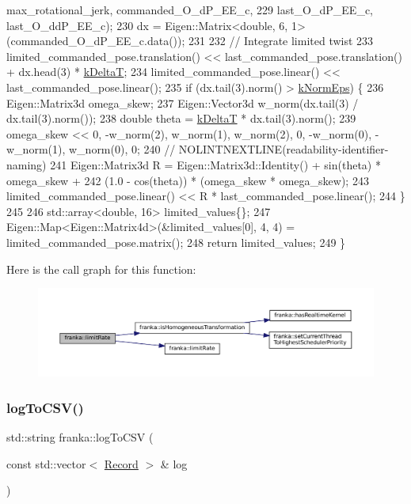 \begin{DoxyCode}
      max\_rotational\_jerk, commanded\_O\_dP\_EE\_c,
229                 last\_O\_dP\_EE\_c, last\_O\_ddP\_EE\_c);
230   dx = Eigen::Matrix<double, 6, 1>(commanded\_O\_dP\_EE\_c.data());
231 
232   \textcolor{comment}{// Integrate limited twist}
233   limited\_commanded\_pose.translation() << last\_commanded\_pose.translation() + dx.head(3) * 
      \hyperlink{namespacefranka_a1e207a0d5a6e90c1e1a78e6e1057120a}{kDeltaT};
234   limited\_commanded\_pose.linear() << last\_commanded\_pose.linear();
235   \textcolor{keywordflow}{if} (dx.tail(3).norm() > \hyperlink{namespacefranka_a420d72830a872ef375d9d6cbb1c439b5}{kNormEps}) \{
236     Eigen::Matrix3d omega\_skew;
237     Eigen::Vector3d w\_norm(dx.tail(3) / dx.tail(3).norm());
238     \textcolor{keywordtype}{double} theta = \hyperlink{namespacefranka_a1e207a0d5a6e90c1e1a78e6e1057120a}{kDeltaT} * dx.tail(3).norm();
239     omega\_skew << 0, -w\_norm(2), w\_norm(1), w\_norm(2), 0, -w\_norm(0), -w\_norm(1), w\_norm(0), 0;
240     \textcolor{comment}{// NOLINTNEXTLINE(readability-identifier-naming)}
241     Eigen::Matrix3d R = Eigen::Matrix3d::Identity() + sin(theta) * omega\_skew +
242                         (1.0 - cos(theta)) * (omega\_skew * omega\_skew);
243     limited\_commanded\_pose.linear() << R * last\_commanded\_pose.linear();
244   \}
245 
246   std::array<double, 16> limited\_values\{\};
247   Eigen::Map<Eigen::Matrix4d>(&limited\_values[0], 4, 4) = limited\_commanded\_pose.matrix();
248   \textcolor{keywordflow}{return} limited\_values;
249 \}
\end{DoxyCode}
Here is the call graph for this function\+:
\nopagebreak
\begin{figure}[H]
\begin{center}
\leavevmode
\includegraphics[width=350pt]{namespacefranka_a304bcb6a14ee8247a951f1c3cfd12711_cgraph}
\end{center}
\end{figure}
\mbox{\label{namespacefranka_a01fbdb37b0e6beb04ba108d5f5024fd9}} 
\subsubsection{\texorpdfstring{log\+To\+C\+S\+V()}{logToCSV()}}
{\footnotesize\ttfamily std\+::string franka\+::log\+To\+C\+SV (\begin{DoxyParamCaption}\item[{const std\+::vector$<$ \hyperlink{structfranka_1_1Record}{Record} $>$ \&}]{log }\end{DoxyParamCaption})}

